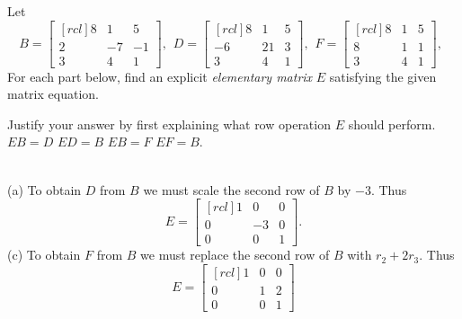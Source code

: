 \bb
\ii Let \[
B =
\begin{bmatrix}[rcl]
8&1&5\\
2&-7&-1\\
3&4&1
\end{bmatrix}, \hspace{5pt}
D =
\begin{bmatrix}[rcl]
8&1&5\\
-6&21&3\\
3&4&1
\end{bmatrix}, \hspace{5pt}
F =
\begin{bmatrix}[rcl]
8&1&5\\
8&1&1\\
3&4&1
\end{bmatrix}, \hspace{5pt}
\]
For each part below, find an explicit {\em elementary matrix} $E$ satisfying the given matrix equation.

Justify your answer by first explaining what row operation $E$ should perform.
\bb
\ii $EB = D$
\ii $ED=B$
\ii $EB=F$
\ii $EF=B$.
\ee
\begin{solution}
\ \\
(a) To obtain $D$ from $B$ we must scale the second row of $B$ by $-3$. Thus
\[ E =
\begin{bmatrix}[rcl]
1&0&0\\
0&-3&0\\
0&0&1
\end{bmatrix}.
\]
\noindent (c) To obtain $F$ from $B$ we must replace the second row of $B$ with $r_2+2r_3$. Thus
\[
E =
\begin{bmatrix}[rcl]
1&0&0\\
0&1&2\\
0&0&1
\end{bmatrix}
\]
\end{solution}

